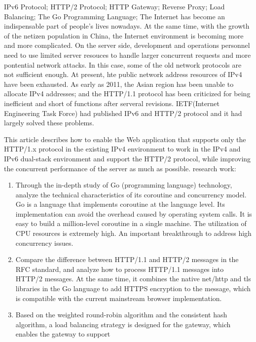 \documentclass[twoside]{CUGThesis}
\begin{document}
	\begin{enabstract}{IPv6 Protocol; HTTP/2 Protocol; HTTP Gateway; Reverse Proxy; Load Balancing; The Go Programming Language;}
		The Internet has become an indispensable part of people's lives nowadays.
		At the same time, with the growth of the netizen population in China, the Internet 
		environment is becoming more and more complicated. On the server side, development and operations
		personnel need to use limited server resouces to handle larger concurrent requests and more 
		pontential network attacks. In this case, some of the old network protocols are not 
		sufficient enough. At present, hte public network address resources of IPv4 have been
		exhausted. As early as 2011, the Asian region has been unable to allocate IPv4 addresses; 
		and the HTTP/1.1 protocol has been criticized for being inefficient and short of functions
		 after serveral revisions. IETF(Internet Engineering Task Force) had published IPv6 and HTTP/2 protocol and it had largely solved 
		 these problems.\par 
		 This article describes how to enable the Web application that supports only the HTTP/1.x protocol
		 in the existing IPv4 environment to work in the IPv4 and IPv6 dual-stack environment and support 
		 the HTTP/2 protocol, while improving the concurrent performance of the server as much as possible. research work: \par 
		 \begin{enumerate}
			\item  Through the in-depth study of Go (programming language) technology, analyze the technical characteristics of its coroutine and concurrency model. 
			Go is a language that implements coroutine at the language level. Its implementation can avoid the overhead caused by operating system calls. 
			It is easy to build a million-level coroutine in a single machine. The utilization of CPU resources is extremely high. An important breakthrough to address high concurrency issues.
			\item Compare the difference between HTTP/1.1 and HTTP/2 messages in the RFC standard, and analyze how to process HTTP/1.1 messages into HTTP/2 messages. At the same time, 
			it combines the native net/http and tls libraries in the Go language to add HTTPS encryption to the message, which is compatible with the current mainstream browser implementation.
			\item  Based on the weighted round-robin algorithm and the consistent hash algorithm, a load balancing strategy is designed for the gateway, which enables the gateway to support

\end{enumerate}
\end{enabstract}
\end{document}
